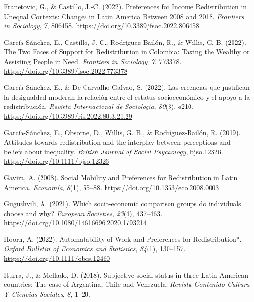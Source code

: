 \documentclass[
  12pt,
]{book}
\newlength{\cslhangindent}
\newenvironment{cslreferences}%
  {\setlength{\parindent}{0pt}%
  \everypar{\setlength{\hangindent}{\cslhangindent}}\ignorespaces}%
  {\par}
\begin{document}
\begin{cslreferences}
\leavevmode\hypertarget{ref-franetovic_preferences_2022}{}%
Franetovic, G., \& Castillo, J.-C. (2022). Preferences for Income Redistribution in Unequal Contexts: Changes in Latin America Between 2008 and 2018. \emph{Frontiers in Sociology}, \emph{7}, 806458. \url{https://doi.org/10.3389/fsoc.2022.806458}

\leavevmode\hypertarget{ref-garcia-sanchez_two_2022}{}%
García-Sánchez, E., Castillo, J. C., Rodríguez-Bailón, R., \& Willis, G. B. (2022). The Two Faces of Support for Redistribution in Colombia: Taxing the Wealthy or Assisting People in Need. \emph{Frontiers in Sociology}, \emph{7}, 773378. \url{https://doi.org/10.3389/fsoc.2022.773378}

\leavevmode\hypertarget{ref-garcia-sanchez_creencias_2022}{}%
García-Sánchez, E., \& De Carvalho Galvão, S. (2022). Las creencias que justifican la desigualdad moderan la relación entre el estatus socioeconómico y el apoyo a la redistribución. \emph{Revista Internacional de Sociología}, \emph{80}(3), e210. \url{https://doi.org/10.3989/ris.2022.80.3.21.29}

\leavevmode\hypertarget{ref-Garcia-Sanchez19}{}%
García-Sánchez, E., Obsorne, D., Willis, G. B., \& Rodríguez-Bailón, R. (2019). Attitudes towards redistribution and the interplay between perceptions and beliefs about inequality. \emph{British Journal of Social Psychology}, bjso.12326. \url{https://doi.org/10.1111/bjso.12326}

\leavevmode\hypertarget{ref-gavira_social_2008}{}%
Gavira, A. (2008). Social Mobility and Preferences for Redistribution in Latin America. \emph{Economía}, \emph{8}(1), 55--88. \url{https://doi.org/10.1353/eco.2008.0003}

\leavevmode\hypertarget{ref-gugushvili_which_2021}{}%
Gugushvili, A. (2021). Which socio-economic comparison groups do individuals choose and why? \emph{European Societies}, \emph{23}(4), 437--463. \url{https://doi.org/10.1080/14616696.2020.1793214}

\leavevmode\hypertarget{ref-hoorn_automatability_2022}{}%
Hoorn, A. (2022). Automatability of Work and Preferences for Redistribution*. \emph{Oxford Bulletin of Economics and Statistics}, \emph{84}(1), 130--157. \url{https://doi.org/10.1111/obes.12460}

\leavevmode\hypertarget{ref-IturraMellado2019}{}%
Iturra, J., \& Mellado, D. (2018). Subjective social status in three Latin American countries: The case of Argentina, Chile and Venezuela. \emph{Revista Contenido Cultura Y Ciencias Sociales}, \emph{8}, 1--20.


\end{cslreferences}
\end{document}
